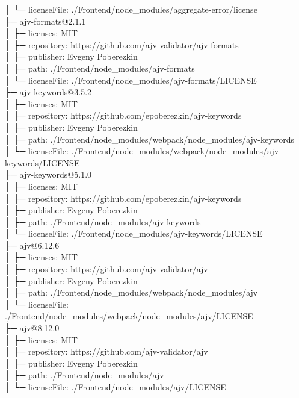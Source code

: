 │  └─ licenseFile: ./Frontend/node\_modules/aggregate-error/license\\
├─ ajv-formats@2.1.1\\
│  ├─ licenses: MIT\\
│  ├─ repository: https://github.com/ajv-validator/ajv-formats\\
│  ├─ publisher: Evgeny Poberezkin\\
│  ├─ path: ./Frontend/node\_modules/ajv-formats\\
│  └─ licenseFile: ./Frontend/node\_modules/ajv-formats/LICENSE\\
├─ ajv-keywords@3.5.2\\
│  ├─ licenses: MIT\\
│  ├─ repository: https://github.com/epoberezkin/ajv-keywords\\
│  ├─ publisher: Evgeny Poberezkin\\
│  ├─ path: ./Frontend/node\_modules/webpack/node\_modules/ajv-keywords\\
│  └─ licenseFile: ./Frontend/node\_modules/webpack/node\_modules/ajv-keywords/LICENSE\\
├─ ajv-keywords@5.1.0\\
│  ├─ licenses: MIT\\
│  ├─ repository: https://github.com/epoberezkin/ajv-keywords\\
│  ├─ publisher: Evgeny Poberezkin\\
│  ├─ path: ./Frontend/node\_modules/ajv-keywords\\
│  └─ licenseFile: ./Frontend/node\_modules/ajv-keywords/LICENSE\\
├─ ajv@6.12.6\\
│  ├─ licenses: MIT\\
│  ├─ repository: https://github.com/ajv-validator/ajv\\
│  ├─ publisher: Evgeny Poberezkin\\
│  ├─ path: ./Frontend/node\_modules/webpack/node\_modules/ajv\\
│  └─ licenseFile: ./Frontend/node\_modules/webpack/node\_modules/ajv/LICENSE\\
├─ ajv@8.12.0\\
│  ├─ licenses: MIT\\
│  ├─ repository: https://github.com/ajv-validator/ajv\\
│  ├─ publisher: Evgeny Poberezkin\\
│  ├─ path: ./Frontend/node\_modules/ajv\\
│  └─ licenseFile: ./Frontend/node\_modules/ajv/LICENSE\\
